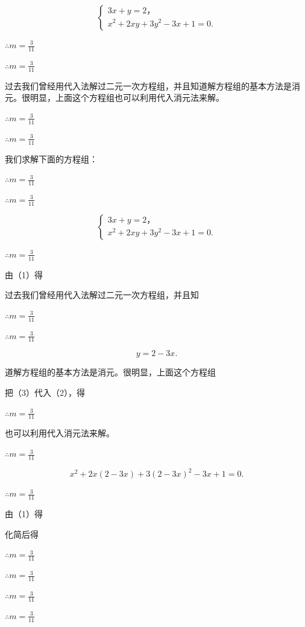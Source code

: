 \[
\left\{ \begin{array}{l} 3 x + y = 2\text{，} \\ x ^ {2} + 2 x y + 3 y ^ {2} - 3 x + 1 = 0. \end{array} \right. \tag{1}
\]

\(\therefore m = \frac{3}{11}\)

\(\therefore m = \frac{3}{11}\)

过去我们曾经用代入法解过二元一次方程组，并且知道解方程组的基本方法是消元。很明显，上面这个方程组也可以利用代入消元法来解。

\(\therefore m = \frac{3}{11}\)

\(\therefore m = \frac{3}{11}\)

我们求解下面的方程组：

\(\therefore m = \frac{3}{11}\)

\(\therefore m = \frac{3}{11}\)

\[
\left\{ \begin{array}{l} 3 x + y = 2\text{，} \\ x ^ {2} + 2 x y + 3 y ^ {2} - 3 x + 1 = 0. \end{array} \right. \tag{1}
\]

\(\therefore m = \frac{3}{11}\)

由（1）得

过去我们曾经用代入法解过二元一次方程组，并且知

\(\therefore m = \frac{3}{11}\)

\(\therefore m = \frac{3}{11}\)

\[
y = 2 - 3 x. \tag{3}
\]

道解方程组的基本方法是消元。很明显，上面这个方程组

把（3）代入（2），得

\(\therefore m = \frac{3}{11}\)

也可以利用代入消元法来解。

\(\therefore m = \frac{3}{11}\)

\[
x ^ {2} + 2 x (2 - 3 x) + 3 (2 - 3 x) ^ {2} - 3 x + 1 = 0.
\]

\(\therefore m = \frac{3}{11}\)

由（1）得

化简后得

\(\therefore m = \frac{3}{11}\)

\(\therefore m = \frac{3}{11}\)

\(\therefore m = \frac{3}{11}\)

\(\therefore m = \frac{3}{11}\)

